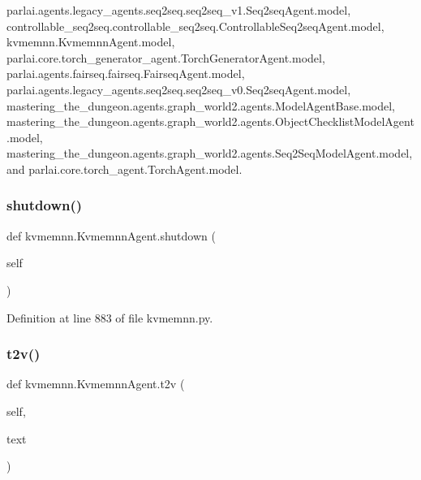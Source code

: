 parlai.\+agents.\+legacy\+\_\+agents.\+seq2seq.\+seq2seq\+\_\+v1.\+Seq2seq\+Agent.\+model, controllable\+\_\+seq2seq.\+controllable\+\_\+seq2seq.\+Controllable\+Seq2seq\+Agent.\+model, kvmemnn.\+Kvmemnn\+Agent.\+model, parlai.\+core.\+torch\+\_\+generator\+\_\+agent.\+Torch\+Generator\+Agent.\+model, parlai.\+agents.\+fairseq.\+fairseq.\+Fairseq\+Agent.\+model, parlai.\+agents.\+legacy\+\_\+agents.\+seq2seq.\+seq2seq\+\_\+v0.\+Seq2seq\+Agent.\+model, mastering\+\_\+the\+\_\+dungeon.\+agents.\+graph\+\_\+world2.\+agents.\+Model\+Agent\+Base.\+model, mastering\+\_\+the\+\_\+dungeon.\+agents.\+graph\+\_\+world2.\+agents.\+Object\+Checklist\+Model\+Agent.\+model, mastering\+\_\+the\+\_\+dungeon.\+agents.\+graph\+\_\+world2.\+agents.\+Seq2\+Seq\+Model\+Agent.\+model, and parlai.\+core.\+torch\+\_\+agent.\+Torch\+Agent.\+model.

\mbox{\label{classkvmemnn_1_1KvmemnnAgent_a78ec1dfcfa978743700d878d965d0195}} 
\subsubsection{\texorpdfstring{shutdown()}{shutdown()}}
{\footnotesize\ttfamily def kvmemnn.\+Kvmemnn\+Agent.\+shutdown (\begin{DoxyParamCaption}\item[{}]{self }\end{DoxyParamCaption})}



Definition at line 883 of file kvmemnn.\+py.

\mbox{\label{classkvmemnn_1_1KvmemnnAgent_adf2131a64c05d6d6538b431be1ea8531}} 
\subsubsection{\texorpdfstring{t2v()}{t2v()}}
{\footnotesize\ttfamily def kvmemnn.\+Kvmemnn\+Agent.\+t2v (\begin{DoxyParamCaption}\item[{}]{self,  }\item[{}]{text }\end{DoxyParamCaption})}



